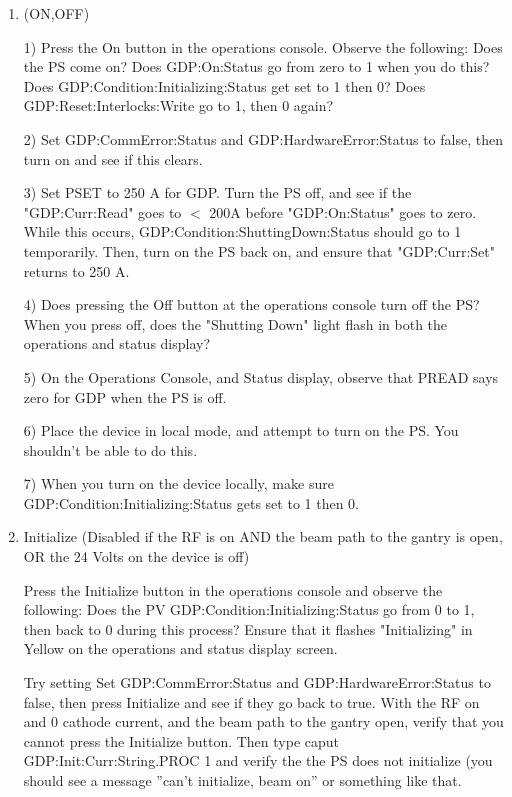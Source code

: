 \documentclass[11pt]{book}		%
\begin{document}
\begin{enumerate}

 \item (ON,OFF)

\color{red}
1) Press the On button in the operations console. Observe the following: 
	Does the PS come on? 
	Does GDP:On:Status go from zero to 1 when you do this? 
	Does GDP:Condition:Initializing:Status get set to 1 then 0?
	Does GDP:Reset:Interlocks:Write go to 1, then 0 again?

2) Set GDP:CommError:Status and GDP:HardwareError:Status to false, then turn on and see if this clears.

3) Set PSET to 250 A for GDP. Turn the PS off, and see if the "GDP:Curr:Read" goes to $<$ 200A before "GDP:On:Status" goes to zero. While this occurs, GDP:Condition:ShuttingDown:Status should go to 1 temporarily. Then, turn on the PS back on, and ensure that "GDP:Curr:Set" returns to 250 A.

4) Does pressing the Off button at the operations console turn off the PS? When you press off, does the "Shutting Down" light flash in both the operations and status display?

5) On the Operations Console, and Status display, observe that PREAD says zero for GDP when the PS is off.

6) Place the device in local mode, and attempt to turn on the PS. You shouldn't be able to do this.

7) When you turn on the device locally, make sure GDP:Condition:Initializing:Status gets set to 1 then 0.


\color{black}

 \item Initialize (Disabled if the RF is on AND the beam path to the gantry is open, OR the 24 Volts on the device is off)

\color{red}

Press the Initialize button in the operations console and observe the following:
	Does the PV GDP:Condition:Initializing:Status go from 0 to 1, then back to 0 during this process? 
	Ensure that it flashes "Initializing" in Yellow on the operations and status display screen. 

Try setting Set GDP:CommError:Status and GDP:HardwareError:Status to false, then press Initialize and see if they go back to true.
With the RF on and 0 cathode current, and the beam path to the gantry open, verify that you cannot press the Initialize button. Then type caput GDP:Init:Curr:String.PROC 1 and verify the the PS does not initialize (you should see a message ''can't initialize, beam on'' or something like that.


\end{enumerate}
\end{document}
